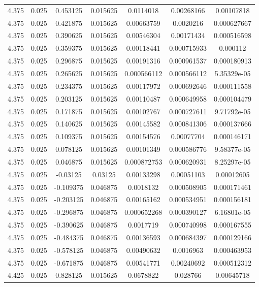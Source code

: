 \begin{flushleft}
\begin{longtable}{ccccccc}
4.375 & 0.025 & 0.453125 & 0.015625 & 0.0114018 & 0.00268166 & 0.00107818  \\ 
4.375 & 0.025 & 0.421875 & 0.015625 & 0.00663759 & 0.0020216 & 0.000627667  \\ 
4.375 & 0.025 & 0.390625 & 0.015625 & 0.00546304 & 0.00171434 & 0.000516598  \\ 
4.375 & 0.025 & 0.359375 & 0.015625 & 0.00118441 & 0.000715933 & 0.000112  \\ 
4.375 & 0.025 & 0.296875 & 0.015625 & 0.00191316 & 0.000961537 & 0.000180913  \\ 
4.375 & 0.025 & 0.265625 & 0.015625 & 0.000566112 & 0.000566112 & 5.35329e-05  \\ 
4.375 & 0.025 & 0.234375 & 0.015625 & 0.00117972 & 0.000692646 & 0.000111558  \\ 
4.375 & 0.025 & 0.203125 & 0.015625 & 0.00110487 & 0.000649958 & 0.000104479  \\ 
4.375 & 0.025 & 0.171875 & 0.015625 & 0.00102767 & 0.000727611 & 9.71792e-05  \\ 
4.375 & 0.025 & 0.140625 & 0.015625 & 0.00145582 & 0.000841306 & 0.000137666  \\ 
4.375 & 0.025 & 0.109375 & 0.015625 & 0.00154576 & 0.00077704 & 0.000146171  \\ 
4.375 & 0.025 & 0.078125 & 0.015625 & 0.00101349 & 0.000586776 & 9.58377e-05  \\ 
4.375 & 0.025 & 0.046875 & 0.015625 & 0.000872753 & 0.000620931 & 8.25297e-05  \\ 
4.375 & 0.025 & -0.03125 & 0.03125 & 0.00133298 & 0.00051103 & 0.00012605  \\ 
4.375 & 0.025 & -0.109375 & 0.046875 & 0.0018132 & 0.000508905 & 0.000171461  \\ 
4.375 & 0.025 & -0.203125 & 0.046875 & 0.00165162 & 0.000534951 & 0.000156181  \\ 
4.375 & 0.025 & -0.296875 & 0.046875 & 0.000652268 & 0.000390127 & 6.16801e-05  \\ 
4.375 & 0.025 & -0.390625 & 0.046875 & 0.0017719 & 0.000740998 & 0.000167555  \\ 
4.375 & 0.025 & -0.484375 & 0.046875 & 0.00136593 & 0.000684397 & 0.000129166  \\ 
4.375 & 0.025 & -0.578125 & 0.046875 & 0.00490632 & 0.0016963 & 0.000463953  \\ 
4.375 & 0.025 & -0.671875 & 0.046875 & 0.00541771 & 0.00240692 & 0.000512312  \\ 
4.425 & 0.025 & 0.828125 & 0.015625 & 0.0678822 & 0.028766 & 0.00645718  \\ 

\end{longtable}
\end{flushleft}
